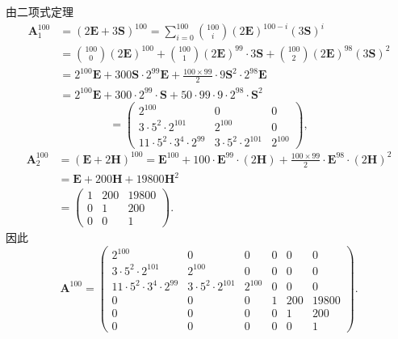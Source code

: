 \documentclass[../../main.tex]{subfiles}%
\begin{document}
\begin{solution}
\[\]
由二项式定理
\[
\begin{aligned}
\boldsymbol{A}_1^{100} &= (2\boldsymbol{E} + 3\boldsymbol{S})^{100} = \sum_{i=0}^{100} \binom{100}{i} (2\boldsymbol{E})^{100 - i} (3\boldsymbol{S})^i \\
&= \binom{100}{0} (2\boldsymbol{E})^{100} + \binom{100}{1} (2\boldsymbol{E})^{99} \cdot 3\boldsymbol{S} + \binom{100}{2} (2\boldsymbol{E})^{98} (3\boldsymbol{S})^2 \\
&= 2^{100}\boldsymbol{E} + 300\boldsymbol{S} \cdot 2^{99}\boldsymbol{E} + \frac{100 \times 99}{2} \cdot 9\boldsymbol{S}^2 \cdot 2^{98}\boldsymbol{E} \\
&= 2^{100}\boldsymbol{E} + 300 \cdot 2^{99} \cdot \boldsymbol{S} + 50 \cdot 99 \cdot 9 \cdot 2^{98} \cdot \boldsymbol{S}^2
\end{aligned}
\]
\[
= \begin{pmatrix} 2^{100} & 0 & 0 \\ 3 \cdot 5^2 \cdot 2^{101} & 2^{100} & 0 \\ 11 \cdot 5^2 \cdot 3^4 \cdot 2^{99} & 3 \cdot 5^2 \cdot 2^{101} & 2^{100} \end{pmatrix},
\]
\[
\begin{aligned}
\boldsymbol{A}_2^{100} &= (\boldsymbol{E} + 2\boldsymbol{H})^{100} = \boldsymbol{E}^{100} + 100 \cdot \boldsymbol{E}^{99} \cdot (2\boldsymbol{H}) + \frac{100 \times 99}{2} \cdot \boldsymbol{E}^{98} \cdot (2\boldsymbol{H})^2 \\
&= \boldsymbol{E} + 200\boldsymbol{H} + 19800\boldsymbol{H}^2 \\
&= \begin{pmatrix} 1 & 200 & 19800 \\ 0 & 1 & 200 \\ 0 & 0 & 1 \end{pmatrix}.
\end{aligned}
\]
因此
\[
\boldsymbol{A}^{100} = \begin{pmatrix} 2^{100} & 0 & 0 & 0 & 0 & 0 \\ 3 \cdot 5^2 \cdot 2^{101} & 2^{100} & 0 & 0 & 0 & 0 \\ 11 \cdot 5^2 \cdot 3^4 \cdot 2^{99} & 3 \cdot 5^2 \cdot 2^{101} & 2^{100} & 0 & 0 & 0 \\ 0 & 0 & 0 & 1 & 200 & 19800 \\ 0 & 0 & 0 & 0 & 1 & 200 \\ 0 & 0 & 0 & 0 & 0 & 1 \end{pmatrix}.
\]

\end{solution}
\end{document}
